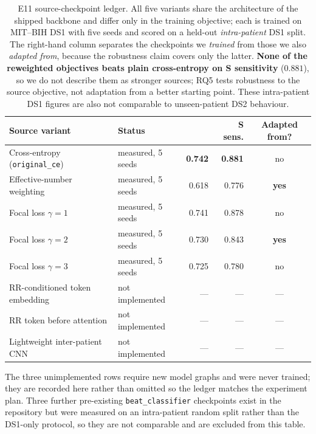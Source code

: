 \begin{table}[H]
\centering
\small
\caption{E11 source-checkpoint ledger. All five variants share the architecture of
the shipped backbone and differ only in the training objective; each is trained on
MIT--BIH DS1 with five seeds and scored on a held-out \emph{intra-patient} DS1
split. The right-hand column separates the checkpoints we \emph{trained} from
those we also \emph{adapted from}, because the robustness claim covers only the
latter. \textbf{None of the reweighted objectives beats plain cross-entropy on S
sensitivity} ($0.881$), so we do not describe them as stronger sources; RQ5 tests
robustness to the source objective, not adaptation from a better starting point.
These intra-patient DS1 figures are also not comparable to unseen-patient DS2
behaviour.}
\label{tab:e11_source_status}
\begin{tabular}{llrrc}
\toprule
Source variant & Status & \macrof{} & S sens. & Adapted from? \\
\midrule
Cross-entropy (\texttt{original\_ce})   & measured, 5 seeds & \textbf{0.742} & \textbf{0.881} & no \\
Effective-number weighting              & measured, 5 seeds & 0.618 & 0.776 & \textbf{yes} \\
Focal loss $\gamma = 1$                 & measured, 5 seeds & 0.741 & 0.878 & no \\
Focal loss $\gamma = 2$                 & measured, 5 seeds & 0.730 & 0.843 & \textbf{yes} \\
Focal loss $\gamma = 3$                 & measured, 5 seeds & 0.725 & 0.780 & no \\
\midrule
RR-conditioned token embedding          & not implemented   & ---   & ---   & --- \\
RR token before attention               & not implemented   & ---   & ---   & --- \\
Lightweight inter-patient CNN           & not implemented   & ---   & ---   & --- \\
\bottomrule
\end{tabular}

\vspace{0.4em}
{\small The three unimplemented rows require new model graphs and were never
trained; they are recorded here rather than omitted so the ledger matches the
experiment plan. Three further pre-existing \texttt{beat\_classifier} checkpoints
exist in the repository but were measured on an intra-patient random split rather
than the DS1-only protocol, so they are not comparable and are excluded from this
table.}
\end{table}
